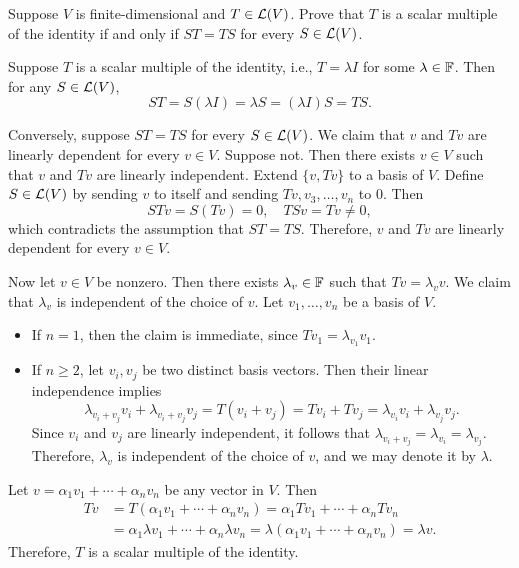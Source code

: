 \begin{exercise}
Suppose $V$ is finite-dimensional and $T\in\mathcal{L}(V)$. Prove that $T$ is a
scalar multiple of the identity if and only if $ST=TS$ for every
$S\in\mathcal{L}(V)$.
\end{exercise}
\begin{solution}
Suppose $T$ is a scalar multiple of the identity, i.e., $T=\lambda I$ for some
$\lambda\in\mathbb{F}$. Then for any $S\in\mathcal{L}(V)$,
\[ ST=S(\lambda I)=\lambda S=(\lambda I)S=TS. \]

Conversely, suppose $ST=TS$ for every $S\in\mathcal{L}(V)$. We claim that $v$ and
$Tv$ are linearly dependent for every $v\in V$. Suppose not. Then there exists
$v\in V$ such that $v$ and $Tv$ are linearly independent. Extend $\{v,Tv\}$ to
a basis of $V$. Define $S\in\mathcal{L}(V)$ by sending $v$ to itself and sending
$Tv,v_3,\dots,v_n$ to $0$. Then
\[ STv=S(Tv)=0, \quad TSv=Tv\ne0, \]
which contradicts the assumption that $ST=TS$. Therefore, $v$ and $Tv$ are
linearly dependent for every $v\in V$.

Now let $v\in V$ be nonzero. Then there exists $\lambda_v\in\mathbb{F}$ such that
$Tv=\lambda_vv$. We claim that $\lambda_v$ is independent of the choice of
$v$. Let $v_1,\dots,v_n$ be a basis of $V$.
\begin{itemize}
\item If $n=1$, then the claim is immediate, since $Tv_1=\lambda_{v_1}v_1$.
\item If $n\ge2$, let $v_i,v_j$ be two distinct basis vectors. Then their
  linear independence implies
  \[ \lambda_{v_i+v_j}v_i+\lambda_{v_i+v_j}v_j=T(v_i+v_j)=Tv_i+Tv_j
     =\lambda_{v_i}v_i+\lambda_{v_j}v_j. \]
  Since $v_i$ and $v_j$ are linearly independent, it follows that
  $\lambda_{v_i+v_j}=\lambda_{v_i}=\lambda_{v_j}$. Therefore, $\lambda_v$ is
  independent of the choice of $v$, and we may denote it by $\lambda$.
\end{itemize}
Let $v=\alpha_1v_1+\cdots+\alpha_nv_n$ be any vector in $V$. Then
\begin{align*}
Tv &= T(\alpha_1v_1+\cdots+\alpha_nv_n)=\alpha_1Tv_1+\cdots+\alpha_nTv_n\\
   &= \alpha_1\lambda v_1+\cdots+\alpha_n\lambda v_n
    =\lambda(\alpha_1v_1+\cdots+\alpha_nv_n)=\lambda v.
\end{align*}
Therefore, $T$ is a scalar multiple of the identity.
\end{solution}

